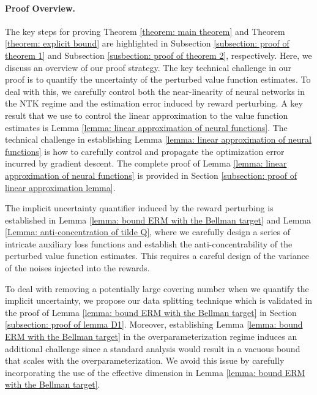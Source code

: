 \documentclass{article} \usepackage{iclr2023/iclr2023_conference,times}
\begin{document}
\paragraph{Proof Overview.} The key steps for proving Theorem \ref{theorem: main theorem} and Theorem \ref{theorem: explicit bound} are highlighted in Subsection \ref{subsection: proof of theorem 1} and Subsection \ref{susbection: proof of theorem 2}, respectively. Here, we discuss an overview of our proof strategy. The key technical challenge in our proof is to quantify the uncertainty of the perturbed value function estimates. To deal with this, we carefully control both the near-linearity of neural networks in the NTK regime and the estimation error induced by reward perturbing. A key result that we use to control the linear approximation to the value function estimates is Lemma \ref{lemma: linear approximation of neural functions}. The technical challenge in establishing Lemma \ref{lemma: linear approximation of neural functions} is how to carefully control and propagate the optimization error incurred by gradient descent. The complete proof of Lemma \ref{lemma: linear approximation of neural functions} is provided in Section \ref{subsection: proof of linear approximation lemma}. 

The implicit uncertainty quantifier induced by the reward perturbing is established in Lemma \ref{lemma: bound ERM with the Bellman target} and Lemma \ref{Lemma: anti-concentration of tilde Q}, where we carefully design a series of intricate auxiliary loss functions and establish the anti-concentrability of the perturbed value function estimates. This requires a careful design of the variance of the noises injected into the rewards. 

To deal with removing a potentially large covering number when we quantify the implicit uncertainty, we propose our data splitting technique which is validated in the proof of Lemma \ref{lemma: bound ERM with the Bellman target} in Section \ref{subsection: proof of lemma D1}.  Moreover, establishing Lemma \ref{lemma: bound ERM with the Bellman target} in the overparameterization regime induces an additional challenge since a standard analysis would result in a vacuous bound that scales with the overparameterization. We avoid this issue by carefully incorporating the use of the effective dimension in Lemma \ref{lemma: bound ERM with the Bellman target}.  

 
\end{document}
